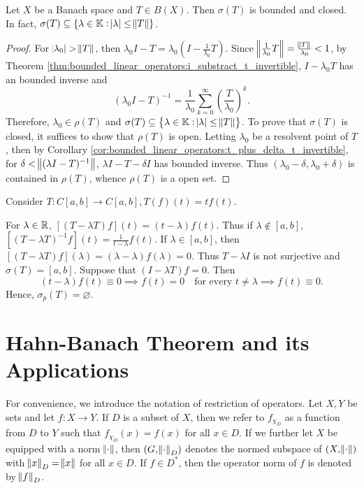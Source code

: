 \begin{thm}
Let $X$ be a Banach space and $T \in B(X)$. 
Then $\sigma(T)$ is bounded and closed. 
In fact, $\sigma(T) \subseteq \{ \lambda \in \mathbb{K}: \abs{\lambda} \le \norm{T} 
\}$. 
\end{thm}
\begin{proof}
For $\abs{\lambda_0} > \norm{T}$, then $\lambda_0 I - T = \lambda_0 
(I - \frac{1}{\lambda_0} T)$. 
Since $\norm{\frac{1}{\lambda_0} T} = \frac{\norm{T}}{\lambda_0}< 1$, by Theorem 
\ref{thm:bounded_linear_operators:i_substract_t_invertible}, $I - \lambda_0 T$ 
has an bounded inverse and 
\begin{equation*}
    (\lambda_0 I - T)^{-1} = \frac{1}{\lambda_0} \sum_{k=0}^{\infty} 
        \left( \frac{T}{\lambda_0} \right) ^k.
\end{equation*}
Therefore, $\lambda_0 \in \rho(T)$ and $\sigma(T) \subseteq \left\{ 
\lambda \in \mathbb{K}: \abs{\lambda} \le \norm{T} \right\}$. 
To prove that $\sigma(T)$ is closed, it suffices to show that $\rho(T)$ is 
open. 
Letting $\lambda_0$ be a resolvent point of $T$, then by Corollary 
\ref{cor:bounded_linear_operators:t_plus_delta_t_invertible}, for 
$\delta < \norm{(\lambda I - T) ^{-1}}$, $\lambda I - T - \delta I$ has 
bounded inverse. 
Thus $(\lambda_0 - \delta, \lambda_0 + \delta)$ is contained in $\rho(T)$, 
whence $\rho(T)$ is a open set. 
\end{proof}

\begin{example}
Consider $T: C[a, b] \to C[a, b], T(f)(t) = t f(t)$. 

For $\lambda \in \mathbb{R}$, $\left[ (T - \lambda T) f \right](t) 
= (t - \lambda) f(t)$. 
Thus if $\lambda \notin [a, b]$, $\left[ (T - \lambda T) ^{-1} f \right](t) 
= \frac{1}{t - \lambda} f(t)$. 
If $\lambda \in [a, b]$, then $\left[ (T - \lambda T) f \right](\lambda) 
= (\lambda - \lambda) f(\lambda) = 0$. 
Thus $T - \lambda I$ is not surjective and $\sigma(T) = [a, b]$. 
Suppose that $(I - \lambda T)f = 0$. 
Then 
\begin{equation*}
    (t - \lambda) f(t) \equiv 0 \implies 
    f(t) = 0 \quad \text{for every } t \neq \lambda \implies 
    f(t) \equiv 0. 
\end{equation*}
Hence, $\sigma_p(T) = \varnothing$. 
\end{example}

\section{Hahn-Banach Theorem and its Applications}
For convenience, we introduce the notation of restriction of operators. 
Let $X, Y$ be sets and let $f: X \to Y$. 
If $D$ is a subset of $X$, then we refer to $f_{\chi_D}$ as a function from 
$D$ to $Y$ such that $f_{\chi_D}(x) = f(x)$ for all $x \in D$. 
If we further let $X$ be equipped with a norm $\norm{\mathord{\cdot}}$, then $(G, 
\norm{\mathord{\cdot}}_D)$ denotes the normed subspace of $(X, \norm{\mathord{\cdot}})$ with 
$\norm{x}_D = \norm{x}$ for all $x \in D$. 
If $f \in D^\ast$, then the operator norm of $f$ is denoted by $\norm{f}_D$. 

